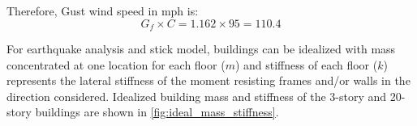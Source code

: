 \documentclass[onecolumn, fleqn]{article}
\begin{document}
Therefore, Gust wind speed in mph is:
\begin{equation*}
G_f \times C = 1.162 \times 95 = \boxed{110.4}
\end{equation*}


For earthquake analysis and stick model, buildings can be idealized with mass concentrated at one location for each floor ($m$) and stiffness of each floor ($k$) represents the lateral stiffness of the moment resisting frames and/or walls in the direction considered. Idealized building mass and stiffness of the 3-story and 20-story buildings are shown in \cref{fig:ideal_mass_stiffness}.
\end{document}
